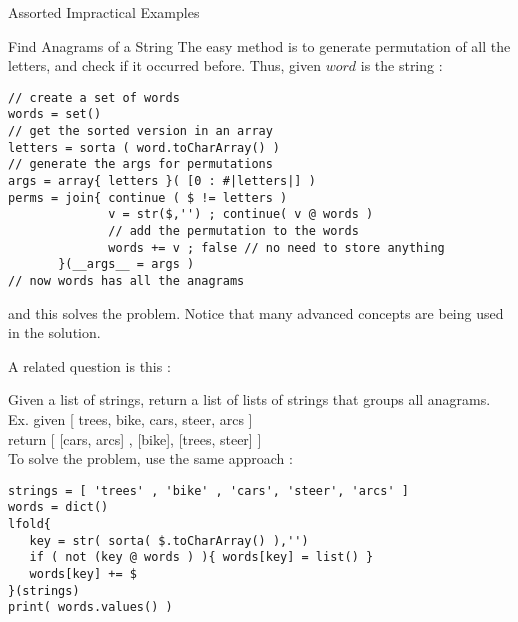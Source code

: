 \begin{section}{Assorted Impractical Examples}
\begin{subsection}{Find Anagrams of a String}
The easy method is to generate permutation of all the letters, and check if it occurred before.
Thus, given $word$ is the string :
\begin{center}\begin{minipage}{\linewidth}
\begin{lstlisting}[style=JexlStyle]
// create a set of words 
words = set()
// get the sorted version in an array 
letters = sorta ( word.toCharArray() )
// generate the args for permutations 
args = array{ letters }( [0 : #|letters|] )
perms = join{ continue ( $ != letters )
              v = str($,'') ; continue( v @ words )
              // add the permutation to the words
              words += v ; false // no need to store anything
       }(__args__ = args )
// now words has all the anagrams 
\end{lstlisting}  
\end{minipage}\end{center}
and this solves the problem. Notice that many advanced concepts are being used in the solution.

A related question is this :

Given a list of strings, return a list of lists of strings that groups all anagrams. \\
Ex. given [ trees, bike, cars, steer, arcs ]  \\
return [ [cars, arcs] , [bike], [trees, steer] ] \\ 
To solve the problem, use the same approach :

\begin{center}\begin{minipage}{\linewidth}
\begin{lstlisting}[style=JexlStyle]
strings = [ 'trees' , 'bike' , 'cars', 'steer', 'arcs' ]
words = dict()
lfold{
   key = str( sorta( $.toCharArray() ),'') 
   if ( not (key @ words ) ){ words[key] = list() }
   words[key] += $ 
}(strings)
print( words.values() )
\end{lstlisting}  
\end{minipage}\end{center}


\end{subsection}


\end{section}
